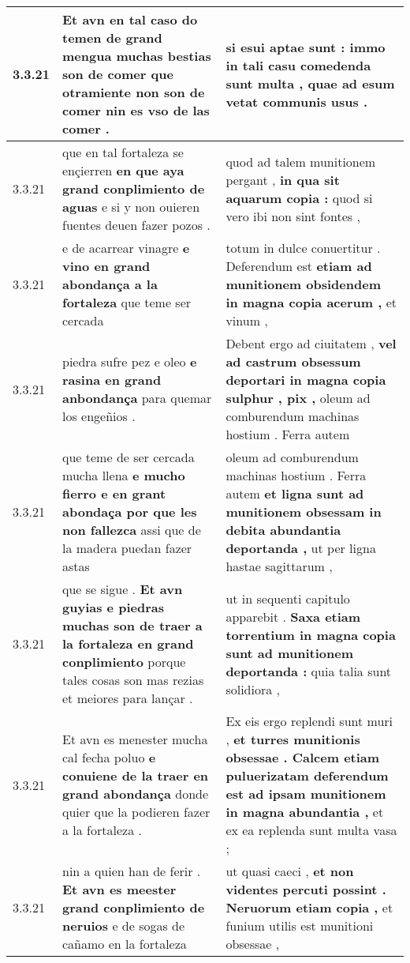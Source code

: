 \begin{tabular}{|p{1cm}|p{6.5cm}|p{6.5cm}|}
3.3.21 & Et avn en tal caso \textbf{ do temen de grand mengua muchas bestias son de comer que otramiente non son de comer } nin es vso de las comer . & si esui aptae sunt : \textbf{ immo in tali casu comedenda sunt multa , } quae ad esum vetat communis usus . \\\hline
3.3.21 & que en tal fortaleza se ençierren \textbf{ en que aya grand conplimiento de aguas } e si y non ouieren fuentes deuen fazer pozos . & quod ad talem munitionem pergant , \textbf{ in qua sit aquarum copia : } quod si vero ibi non sint fontes , \\\hline
3.3.21 & e de acarrear vinagre \textbf{ e vino en grand abondança a la fortaleza } que teme ser cercada & totum in dulce conuertitur . Deferendum est \textbf{ etiam ad munitionem obsidendem in magna copia acerum , } et vinum , \\\hline
3.3.21 & piedra sufre pez e oleo \textbf{ e rasina en grand anbondança } para quemar los engeñios . & Debent ergo ad ciuitatem , \textbf{ vel ad castrum obsessum deportari in magna copia sulphur , pix , } oleum ad comburendum machinas hostium . Ferra autem \\\hline
3.3.21 & que teme de ser cercada mucha llena \textbf{ e mucho fierro e en grant abondaça por que les non fallezca } assi que de la madera puedan fazer astas & oleum ad comburendum machinas hostium . Ferra autem \textbf{ et ligna sunt ad munitionem obsessam in debita abundantia deportanda , } ut per ligna hastae sagittarum , \\\hline
3.3.21 & que se sigue . \textbf{ Et avn guyias e piedras muchas son de traer a la fortaleza en grand conplimiento } porque tales cosas son mas rezias et meiores para lançar . & ut in sequenti capitulo apparebit . \textbf{ Saxa etiam torrentium in magna copia sunt ad munitionem deportanda : } quia talia sunt solidiora , \\\hline
3.3.21 & Et avn es menester mucha cal fecha poluo \textbf{ e conuiene de la traer en grand abondança } donde quier que la podieren fazer a la fortaleza . & Ex eis ergo replendi sunt muri , \textbf{ et turres munitionis obsessae . Calcem etiam puluerizatam deferendum est ad ipsam munitionem in magna abundantia , } et ex ea replenda sunt multa vasa ; \\\hline
3.3.21 & nin a quien han de ferir . \textbf{ Et avn es meester grand conplimiento de neruios } e de sogas de cañamo en la fortaleza & ut quasi caeci , \textbf{ et non videntes percuti possint . Neruorum etiam copia , } et funium utilis est munitioni obsessae , \\\hline

\end{tabular}
